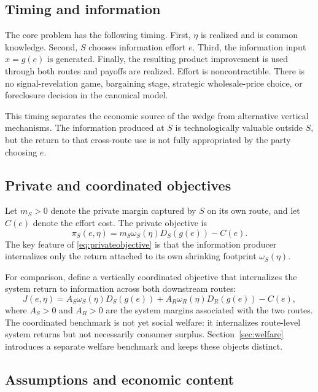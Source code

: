 \subsection{Timing and information}

The core problem has the following timing. First, $\eta$ is realized and is common knowledge. Second, $S$ chooses information effort $e$. Third, the information input $x=g(e)$ is generated. Finally, the resulting product improvement is used through both routes and payoffs are realized. Effort is noncontractible. There is no signal-revelation game, bargaining stage, strategic wholesale-price choice, or foreclosure decision in the canonical model.

This timing separates the economic source of the wedge from alternative vertical mechanisms. The information produced at $S$ is technologically valuable outside $S$, but the return to that cross-route use is not fully appropriated by the party choosing $e$.

\subsection{Private and coordinated objectives}

Let $m_S>0$ denote the private margin captured by $S$ on its own route, and let $C(e)$ denote the effort cost. The private objective is
\begin{equation}
    \pi_S(e,\eta)=m_S\omega_S(\eta)D_S(g(e))-C(e).
    \label{eq:privateobjective}
\end{equation}
The key feature of \eqref{eq:privateobjective} is that the information producer internalizes only the return attached to its own shrinking footprint $\omega_S(\eta)$.

For comparison, define a vertically coordinated objective that internalizes the system return to information across both downstream routes:
\begin{equation}
    J(e,\eta)
    =A_S\omega_S(\eta)D_S(g(e))
    +A_R\omega_R(\eta)D_R(g(e))
    -C(e),
    \label{eq:coordinatedobjective}
\end{equation}
where $A_S>0$ and $A_R>0$ are the system margins associated with the two routes. The coordinated benchmark is not yet social welfare: it internalizes route-level system returns but not necessarily consumer surplus. Section~\ref{sec:welfare} introduces a separate welfare benchmark and keeps these objects distinct.

\subsection{Assumptions and economic content}

